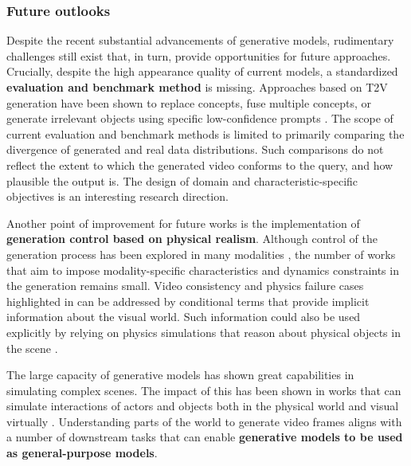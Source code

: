 

\subsubsection{Future outlooks}

Despite the recent substantial advancements of generative models, rudimentary challenges still exist that, in turn, provide opportunities for future approaches. Crucially, despite the high appearance quality of current models, a standardized \textbf{evaluation and benchmark method} is missing. Approaches based on T2V generation have been shown to replace concepts, fuse multiple concepts, or generate irrelevant objects using specific low-confidence prompts \citep{du2023stable}. The scope of current evaluation and benchmark methods \citep{huang2024vbench,liu2024evalcrafter,liu2023fetv,saito2020train,unterthiner2019fvd} is limited to primarily comparing the divergence of generated and real data distributions. Such comparisons do not reflect the extent to which the generated video conforms to the query, and how plausible the output is. The design of domain and characteristic-specific objectives is an interesting research direction. 

Another point of improvement for future works is the implementation of \textbf{generation control based on physical realism}. Although control of the generation process has been explored in many modalities \citep{zhang2023adding}, the number of works that aim to impose modality-specific characteristics and dynamics constraints in the generation remains small. Video consistency and physics failure cases highlighted in  can be addressed by conditional terms that provide implicit information about the visual world. Such information could also be used explicitly by relying on physics simulations that reason about physical objects in the scene \citep{liu2024physgen}.

The large capacity of generative models has shown great capabilities in simulating complex scenes. The impact of this has been shown in works that can simulate interactions of actors and objects both in the physical world \citep{yang2023learning} and visual virtually \citep{alonso2024diffusion,valevski2024diffusion}. Understanding parts of the world to generate video frames aligns with a number of downstream tasks that can enable \textbf{generative models to be used as general-purpose models}. 